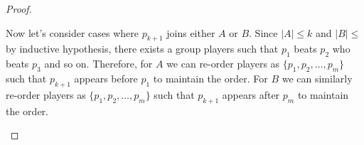 \documentclass[11pt]{exam}
\begin{document}
\begin{parts}
\begin{customsolutionbox}
\begin{proof}
\begin{itemize}
                Now let's consider cases where $p_{k+1}$ joins either $A$ or $B$. Since $|A| \leq k$ and $|B| \leq $ by inductive hypothesis, there exists a group players such that $p_{1}$ beats $p_{2}$ who beats $p_{3}$ and so on. Therefore, for $A$ we can re-order players as $\{p_1, p_2, \ldots, p_m\}$ such that $p_{k+1}$ appears before $p_1$ to maintain the order. For $B$ we can similarly re-order players as $\{p_1, p_2, \ldots, p_m\}$ such that $p_{k+1}$ appears after $p_m$ to maintain the order. \\
            \end{itemize}
        \end{proof}
    \end{customsolutionbox}
\end{parts}
\end{document}
